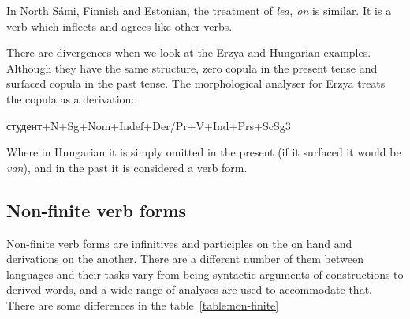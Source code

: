\documentclass[free]{flammie}
\begin{document}
In North Sámi, Finnish and Estonian, the treatment of \emph{lea, on} is similar. It is a verb which inflects and agrees like other verbs.

There are divergences when we look at the Erzya and Hungarian examples. Although they have the same structure, zero copula in the present tense and surfaced copula in the past tense. The morphological analyser for Erzya treats the copula as a derivation:

  студент+N+Sg+Nom+Indef+Der/Pr+V+Ind+Prs+ScSg3
  
Where in Hungarian it is simply omitted in the present (if it surfaced it would be \emph{van}), and in the past it is considered a verb form.

\subsection{Non-finite verb forms}

Non-finite verb forms are infinitives and participles on the on hand and derivations on the another. There are a different number of them between languages and their tasks vary from being syntactic arguments of constructions to derived words, and a wide range of analyses are used to accommodate that. There are some differences in the table~\ref{table:non-finite}
\end{document}

